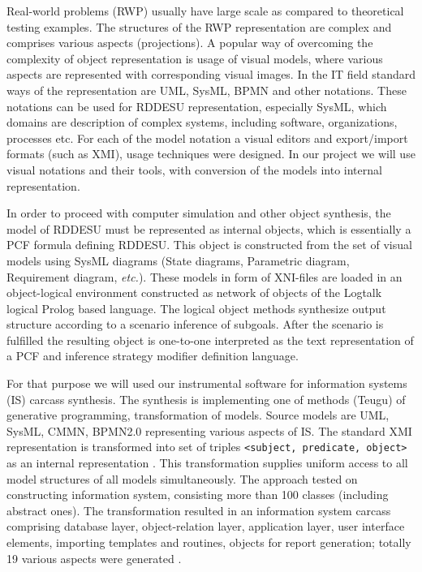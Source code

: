 \documentclass[runningheads]{llncs}
\begin{document}
Real-world problems (RWP) usually have large scale as compared to theoretical testing examples. The structures of the RWP representation are complex and comprises various aspects (projections). A popular way of overcoming the complexity of object representation is usage of visual models, where various aspects are represented with corresponding visual images. In the IT field standard ways of the representation are UML, SysML, BPMN and other notations. These notations can be used for RDDESU representation, especially SysML, which domains are description of complex systems, including software, organizations, processes etc. For each of the model notation a visual editors and export/import formats (such as XMI), usage techniques were designed. In our project we will use visual notations and their tools, with conversion of the models into internal representation.

In order to proceed with computer simulation and other object synthesis, the model of RDDESU must be represented as internal objects, which is essentially a PCF formula defining RDDESU. This object is constructed from the set of visual models using SysML diagrams (State diagrams, Parametric diagram, Requirement diagram, \emph{etc.}). These models in form of XNI-files are loaded in an object-logical environment constructed as network of objects of the Logtalk logical Prolog based language. The logical object methods synthesize output structure according to a scenario inference of subgoals. After the scenario is fulfilled the resulting object is one-to-one interpreted as the text representation of a PCF and inference strategy modifier definition language.

For that purpose we will used our instrumental software for information systems (IS) carcass synthesis. The synthesis is implementing one of methods (Teugu) of generative programming, transformation of models. Source models are UML, SysML, CMMN, BPMN2.0 representing various aspects of IS. The standard XMI representation is transformed into set of triples \texttt{<subject, predicate, object>} as an internal representation \cite{b2}. This transformation supplies uniform access to all model structures of all models simultaneously. The approach tested on constructing information system, consisting more than 100 classes (including abstract ones). The transformation resulted in an information system carcass comprising database layer, object-relation layer, application layer, user interface elements, importing templates and routines, objects for report generation; totally 19 various aspects were generated \cite{b3}.
\end{document}
